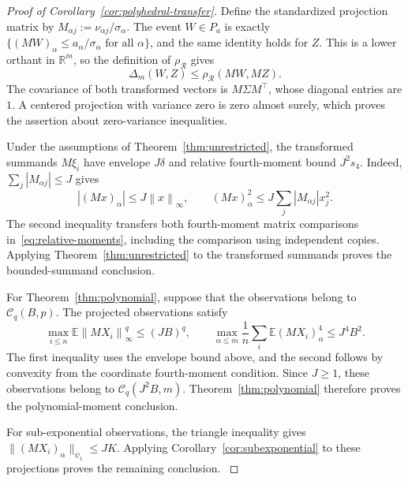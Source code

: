 \documentclass[11pt,letterpaper]{article}
\newenvironment{recovered}{\color{magenta}}{}
\theoremstyle{remark}
\newcommand{\E}{\mathbb E}
\newcommand{\R}{\mathbb R}
\newcommand{\norm}[1]{\left\lVert#1\right\rVert}
\newcommand{\rh}{\rho_{\mathcal R}}
\begin{document}
\begin{proof}[Proof of Corollary~\ref{cor:polyhedral-transfer}]
\begin{recovered}
Define the standardized projection matrix by
\(M_{\alpha j}:=\nu_{\alpha j}/\sigma_\alpha\).
\end{recovered}
The event \(W\in P_a\) is exactly
\(\{(MW)_\alpha\le a_\alpha/\sigma_\alpha\text{ for all }\alpha\}\),
and the same identity holds for \(Z\). This is a lower orthant in
\(\R^m\), so the definition of \(\rh\) gives
\begin{equation}
 \Delta_m(W,Z)\le\rh(MW,MZ).
 \label{eq:polyhedral-transfer}
\end{equation}
The covariance of both transformed vectors
is \(M\Sigma M^\top\), whose diagonal entries are \(1\).
A centered projection with variance zero is zero almost surely,
which proves the assertion about zero-variance inequalities.

Under the assumptions of Theorem~\ref{thm:unrestricted}, the
transformed summands \(M\xi_i\) have envelope \(J\delta\) and
relative fourth-moment bound \(J^2s_4\).
Indeed, \(\sum_j|M_{\alpha j}|\le J\) gives
\[
 |(Mx)_\alpha|\le J\norm{x}_\infty,
 \qquad
 (Mx)_\alpha^2\le J\sum_j|M_{\alpha j}|x_j^2.
\]
The second inequality transfers both fourth-moment matrix comparisons
in~\eqref{eq:relative-moments}, including the comparison using
independent copies. \begin{recovered}Applying
Theorem~\ref{thm:unrestricted} to the transformed summands proves the
bounded-summand conclusion.\end{recovered}

For Theorem~\ref{thm:polynomial}, suppose that the observations belong
to \(\mathcal C_q(B,p)\). The projected observations satisfy
\[
 \max_{i\le n}\E\norm{MX_i}_\infty^q\le (JB)^q,
 \qquad
 \max_{\alpha\le m}\frac1n\sum_i\E(MX_i)_\alpha^4
 \le J^4B^2.
\]
The first inequality uses the envelope bound above, and the second
follows by convexity from the coordinate fourth-moment condition.
Since \(J\ge1\), these observations belong to
\(\mathcal C_q(J^2B,m)\).
\begin{recovered}
Theorem~\ref{thm:polynomial} therefore proves the polynomial-moment
conclusion.
\end{recovered}

For sub-exponential observations, the triangle inequality gives
\(\|(MX_i)_\alpha\|_{\psi_1}\le JK\).
\begin{recovered}
Applying Corollary~\ref{cor:subexponential} to these projections proves
the remaining conclusion.
\end{recovered}
\end{proof}
\end{document}

